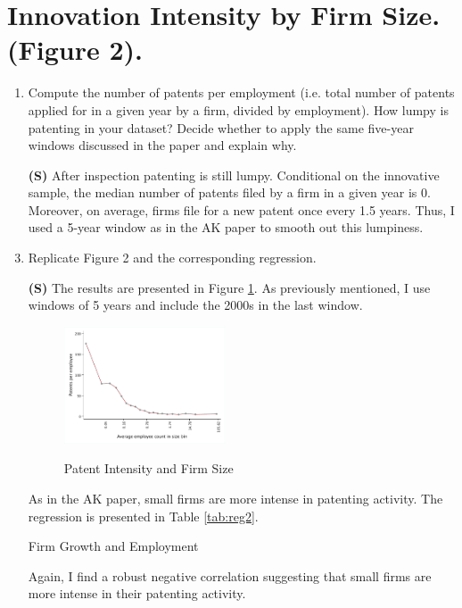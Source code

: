 \documentclass[12pt]{article}
\begin{document}
\FloatBarrier
\section{Innovation Intensity by Firm Size. (Figure 2).}

\begin{enumerate}[leftmargin=0pt, label=\textbf{(\alph*)}]


\item Compute the number of patents per employment (i.e. total number of patents applied for in a given year by a firm, divided by employment). How lumpy is patenting in your dataset? Decide whether to apply the same five-year windows discussed in the paper and explain why.
\item[\textbf{(S)}] After inspection patenting is still lumpy. Conditional on the innovative sample, the median number of patents filed by a firm in a given year is 0. Moreover, on average, firms file for a new patent once every 1.5 years. Thus, I used a 5-year window as in the AK paper to smooth out this lumpiness. 

\item Replicate Figure 2 and the corresponding regression.
\item[\textbf{(S)}] The results are presented in Figure \ref{fig:patent_intesity}. As previously mentioned, I use windows of 5 years and include the 2000s in the last window. 

\begin{figure}[htb]
         \centering
         \caption{Patent Intensity and Firm Size}
         \includegraphics[width=0.45\textwidth]{Figures/Figure4b.pdf}
         \label{fig:patent_intesity}
\end{figure}

As in the AK paper, small firms are more intense in patenting activity. The regression is presented in Table \ref{tab:reg2}. 

\begin{table}[htb]
\centering
\caption{Firm Growth and Employment}
\label{tab:reg2}

\end{table}

Again, I find a robust negative correlation suggesting that small firms are more intense in their patenting activity. 
\end{enumerate}
\end{document}
